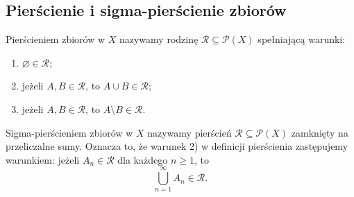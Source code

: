 \begin{samepage}
\section{Pierścienie i sigma-pierścienie zbiorów}
\label{sec:pierscienie}

\begin{definicja}
Pierścieniem zbiorów w $X$ nazywamy rodzinę
$\mathcal{R}\subseteq\mathcal{P}(X)$ spełniającą warunki:
\begin{enumerate}
  \item $\varnothing\in\mathcal{R}$;
  \item jeżeli $A,B\in\mathcal{R}$, to $A\cup B\in\mathcal{R}$;
  \item jeżeli $A,B\in\mathcal{R}$, to $A\setminus B\in\mathcal{R}$.
\end{enumerate}
\end{definicja}

\begin{definicja}
Sigma-pierścieniem zbiorów w $X$ nazywamy pierścień
$\mathcal{R}\subseteq\mathcal{P}(X)$ zamknięty na przeliczalne sumy.
Oznacza to, że warunek 2) w definicji pierścienia zastępujemy warunkiem:
jeżeli $A_n\in\mathcal{R}$ dla każdego $n\geq1$, to
\[
  \bigcup_{n=1}^{\infty}A_n\in\mathcal{R}.
\]
\end{definicja}
\end{samepage}
